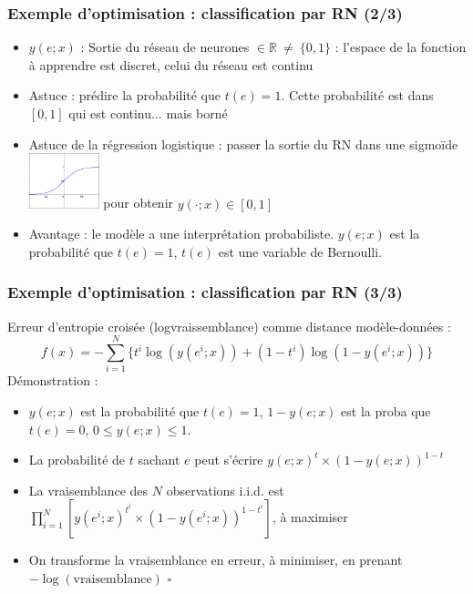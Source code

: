 \documentclass[12pt]{beamer}
\begin{document}
\begin{frame}
\frametitle{Exemple d'optimisation : classification par RN (2/3)}
\begin{itemize}
\item $y(e;x)$ : Sortie du réseau de neurones $\in \mathbb R ~\ne~ \{0,1\}$ : l'espace de la fonction à apprendre est discret, celui du réseau est continu 
\item Astuce : prédire la probabilité que $t(e)=1$. Cette probabilité est dans $[0,1]$ qui est continu... mais borné 
\item Astuce de la régression logistique : passer la sortie du RN dans une sigmoïde 
\includegraphics[width=0.16\textwidth]{SigmoidFunction.png}
pour obtenir $y(\cdot ; x) \in [0,1]$ 
\item Avantage : le modèle a une interprétation probabiliste. $y(e;x)$ est la probabilité que $t(e)=1$, $t(e)$ est une variable de Bernoulli.
\end{itemize}
\end{frame}

\begin{frame}
\frametitle{Exemple d'optimisation : classification par RN (3/3)}
\alert{Erreur d'entropie croisée (logvraissemblance) } comme distance modèle-données : 
\begin{equation*}
f(x) = - \sum_{i=1}^N \{ t^i \log(y(e^i;x)) + (1-t^i) \log(1 - y(e^i;x))\}
\end{equation*}
Démonstration :\\
\begin{itemize}
\item $y(e;x)$ est la probabilité que $t(e)=1$, $1-y(e;x)$ est la proba que $t(e)=0$, $0 \le y(e;x) \le 1$.
\item La probabilité de $t$ sachant $e$ peut s'écrire $y(e;x)^t \times (1 - y(e;x))^{1-t}$
\item La vraisemblance des $N$ observations i.i.d. est $\prod_{i=1}^N \left[y(e^i;x)^{t^i} \times (1-y(e^i;x))^{1-t^i}\right]$, à maximiser
\item On transforme la vraisemblance en erreur, à minimiser, en prenant $-\log(\text{vraisemblance})$ \qquad $\square$
\end{itemize}
\end{frame}
\end{document}
